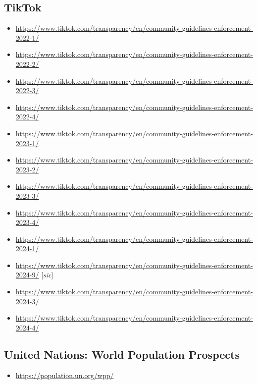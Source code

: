 {\subsection*{TikTok}
{\footnotesize
\begin{itemize}
\item[]\url{https://www.tiktok.com/transparency/en/community-guidelines-enforcement-2022-1/}
\item[]\url{https://www.tiktok.com/transparency/en/community-guidelines-enforcement-2022-2/}
\item[]\url{https://www.tiktok.com/transparency/en/community-guidelines-enforcement-2022-3/}
\item[]\url{https://www.tiktok.com/transparency/en/community-guidelines-enforcement-2022-4/}
\item[]\url{https://www.tiktok.com/transparency/en/community-guidelines-enforcement-2023-1/}
\item[]\url{https://www.tiktok.com/transparency/en/community-guidelines-enforcement-2023-2/}
\item[]\url{https://www.tiktok.com/transparency/en/community-guidelines-enforcement-2023-3/}
\item[]\url{https://www.tiktok.com/transparency/en/community-guidelines-enforcement-2023-4/}
\item[]\url{https://www.tiktok.com/transparency/en/community-guidelines-enforcement-2024-1/}
\item[]\url{https://www.tiktok.com/transparency/en/community-guidelines-enforcement-2024-9/} [\emph{sic}]
\item[]\url{https://www.tiktok.com/transparency/en/community-guidelines-enforcement-2024-3/}
\item[]\url{https://www.tiktok.com/transparency/en/community-guidelines-enforcement-2024-4/}
\end{itemize}
}


\subsection*{United Nations: World Population Prospects}
{\footnotesize
\begin{itemize}
\item[]\url{https://population.un.org/wpp/}
\end{itemize}
}


\hidden{{\color{lowlight}
}}}

